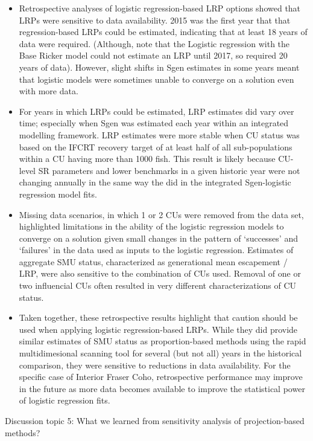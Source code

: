 \documentclass[11pt]{book}
\begin{document}
\begin{itemize}

\item
  Retrospective analyses of logistic regression-based LRP options showed that LRPs were sensitive to data availability. 2015 was the first year that that regression-based LRPs could be estimated, indicating that at least 18 years of data were required. (Although, note that the Logistic regression with the Base Ricker model could not estimate an LRP until 2017, so required 20 years of data). However, slight shifts in Sgen estimates in some years meant that logistic models were sometimes unable to converge on a solution even with more data.
\item
  For years in which LRPs could be estimated, LRP estimates did vary over time; especially when Sgen was estimated each year within an integrated modelling framework. LRP estimates were more stable when CU status was based on the IFCRT recovery target of at least half of all sub-populations within a CU having more than 1000 fish. This result is likely because CU-level SR parameters and lower benchmarks in a given historic year were not changing annually in the same way the did in the integrated Sgen-logistic regression model fits.
\item
  Missing data scenarios, in which 1 or 2 CUs were removed from the data set, highlighted limitations in the ability of the logistic regression models to converge on a solution given small changes in the pattern of `successes' and `failures' in the data used as inputs to the logistic regression. Estimates of aggregate SMU status, characterized as generational mean escapement / LRP, were also sensitive to the combination of CUs used. Removal of one or two influencial CUs often resulted in very different characterizations of CU status.
\item
  Taken together, these retrospective results highlight that caution should be used when applying logistic regression-based LRPs. While they did provide similar estimates of SMU status as proportion-based methods using the rapid multidimesional scanning tool for several (but not all) years in the historical comparison, they were sensitive to reductions in data availability. For the specific case of Interior Fraser Coho, retrospective performance may improve in the future as more data becomes available to improve the statistical power of logistic regression fits.
\end{itemize}
Discussion topic 5: What we learned from sensitivity analysis of projection-based methods?
\end{document}
